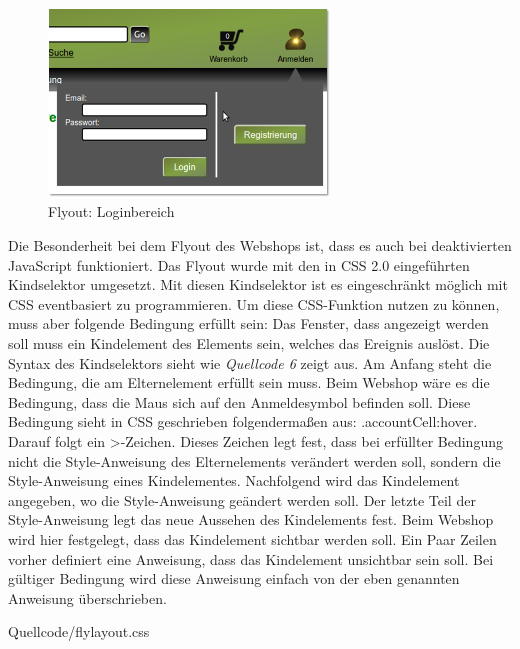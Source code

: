 \begin{figure}[H]
	\begin{center}
			\includegraphics[width=75mm]{Bilder/Abbildung14_Loginbereich.png}
	\end{center}
	\caption{Flyout: Loginbereich}
\end{figure}

Die Besonderheit bei dem Flyout des Webshops ist, dass es auch bei deaktivierten JavaScript funktioniert.  Das Flyout wurde mit den in CSS 2.0 eingeführten \glqq Kindselektor\grqq{} umgesetzt. Mit diesen \glqq Kindselektor\grqq{} ist es eingeschränkt möglich mit CSS eventbasiert zu programmieren. Um diese CSS-Funktion nutzen zu können, muss aber folgende Bedingung erfüllt sein: Das Fenster, dass angezeigt werden soll muss ein Kindelement des Elements sein, welches das Ereignis auslöst. Die Syntax des \glqq Kindselektors\grqq{} sieht wie \textit{Quellcode 6} zeigt aus. Am Anfang steht die Bedingung, die am Elternelement erfüllt sein muss. Beim Webshop wäre es die Bedingung, dass die Maus sich auf den Anmeldesymbol befinden soll. Diese Bedingung sieht in CSS geschrieben folgendermaßen aus: \glqq .accountCell:hover\grqq{}. Darauf folgt ein \glqq >\grqq{}-Zeichen. Dieses Zeichen legt fest, dass bei erfüllter Bedingung nicht die Style-Anweisung des Elternelements verändert werden soll, sondern die Style-Anweisung eines Kindelementes. Nachfolgend wird das Kindelement angegeben, wo die Style-Anweisung geändert werden soll. Der letzte Teil der Style-Anweisung legt das neue Aussehen des Kindelements fest. Beim Webshop wird hier festgelegt, dass das Kindelement sichtbar werden soll. Ein Paar Zeilen vorher definiert eine Anweisung, dass das Kindelement unsichtbar sein soll. Bei gültiger Bedingung wird diese Anweisung einfach von der eben genannten Anweisung überschrieben.

\begin{center}
	\begin{lstinputlisting}[language=CSS, caption={Loginbereich: Umsetzung des Flyouts mit CSS 2.0}]
		{Quellcode/flylayout.css}
	\end{lstinputlisting}
\end{center}


